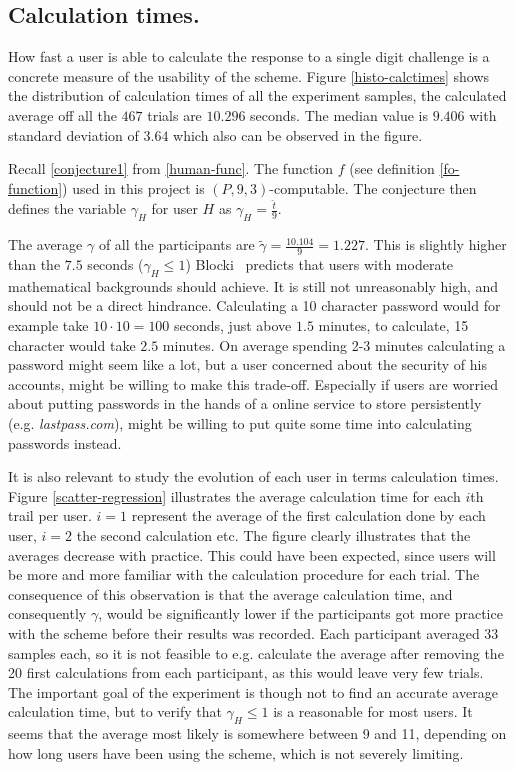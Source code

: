 \subsection{Calculation times.}
How fast a user is able to calculate the response to a single digit challenge is a concrete measure of the usability of the scheme. Figure \ref{histo-calctimes} shows the distribution of calculation times of all the experiment samples, the calculated average off all the $467$ trials are $10.296$ seconds. The median value is $9.406$ with standard deviation of $3.64$ which also can be observed in the figure. 
\par Recall \autoref{conjecture1} from \autoref{human-func}. The function $f$ (see definition \ref{fo-function}) used in this project is $(P,9,3)$-computable. The conjecture then defines the variable $\gamma_H$ for user $H$ as {\Large $\gamma_H = \frac{\hat t}{9}$}. 
\par The average $\gamma$ of all the participants are $\tilde \gamma = \frac{10.104}{9} = 1.227$. This is slightly higher than the $7.5$ seconds ($\gamma_H \le 1 $) Blocki~\cite{hcp-blocki} predicts that users with moderate mathematical backgrounds should achieve. It is still not unreasonably high, and should not be a direct hindrance. Calculating a 10 character password would for example take $10 \cdot 10 = 100$ seconds, just above $1.5$ minutes, to calculate, 15 character would take $2.5$ minutes. On average spending 2-3 minutes calculating a password might seem like a lot, but a user concerned about the security of his accounts, might be willing to make this trade-off. Especially if users are worried about putting passwords in the hands of a online service to store persistently (e.g. \emph{lastpass.com}), might be willing to put quite some time into calculating passwords instead.
\par It is also relevant to study the evolution of each user in terms calculation times. Figure \ref{scatter-regression} illustrates the average calculation time for each $i$th trail per user. $i=1$ represent the average of the first calculation done by each user, $i=2$ the second calculation etc. The figure clearly illustrates that the averages decrease with practice. This could have been expected, since users will be more and more familiar with the calculation procedure for each trial. The consequence of this observation is that the average calculation time, and consequently $\gamma$, would be significantly lower if the participants got more practice with the scheme before their results was recorded. Each participant averaged $33$ samples each, so it is not feasible to e.g. calculate the average after removing the 20 first calculations from each participant, as this would leave very few trials. The important goal of the experiment is though not to find an accurate average calculation time, but to verify that $\gamma_H \le 1$ is a reasonable for most users. It seems that the average most likely is somewhere between 9 and 11, depending on how long users have been using the scheme, which is not severely limiting.
